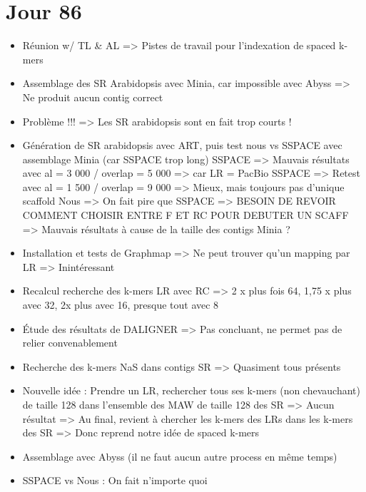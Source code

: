 \documentclass[12pt]{report}
\begin{document}
\section{Jour 86}

\begin{itemize}
	\item Réunion w/ TL \& AL => Pistes de travail pour l'indexation de spaced k-mers
	
	\item Assemblage des SR Arabidopsis avec Minia, car impossible avec Abyss => Ne produit aucun contig correct
	
	\item Problème !!! => Les SR arabidopsis sont en fait trop courts !
	
	\item Génération de SR arabidopsis avec ART, puis test nous vs SSPACE avec assemblage Minia (car SSPACE trop long)
		  SSPACE => Mauvais résultats avec al = 3 000 / overlap = 5 000 => car LR = PacBio 
		  SSPACE => Retest avec al = 1 500 / overlap = 9 000 => Mieux, mais toujours pas d'unique scaffold
		  Nous => On fait pire que SSPACE => BESOIN DE REVOIR COMMENT CHOISIR ENTRE F ET RC POUR DEBUTER UN SCAFF
		  => Mauvais résultats à cause de la taille des contigs Minia ?
	
	\item Installation et tests de Graphmap => Ne peut trouver qu'un mapping par LR => Inintéressant
	
	\item Recalcul recherche des k-mers LR avec RC => 2 x plus fois 64, 1,75 x plus avec 32, 2x plus avec 16, presque tout avec 8
	
	\item Étude des résultats de DALIGNER => Pas concluant, ne permet pas de relier convenablement
	
	\item Recherche des k-mers NaS dans contigs SR => Quasiment tous présents
	
	\item Nouvelle idée : Prendre un LR, rechercher tous ses k-mers (non chevauchant) de taille 128 dans l'ensemble
		  des MAW de taille 128 des SR => Aucun résultat
		  => Au final, revient à chercher les k-mers des LRs dans les k-mers des SR => Donc reprend notre idée de spaced k-mers
		  
	\item Assemblage avec Abyss (il ne faut aucun autre process en même temps)
	
	\item SSPACE vs Nous : On fait n'importe quoi
\end{itemize}
\end{document}
